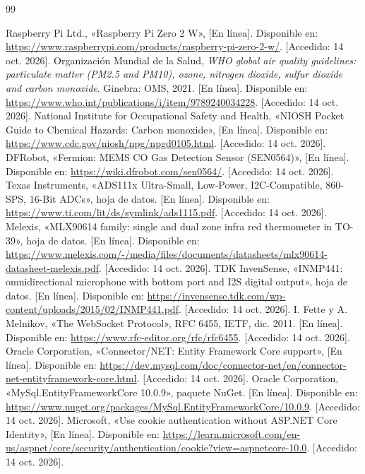 \documentclass[10pt,a4paper]{article}
\begin{document}
\clearpage
\begin{thebibliography}{99}
\small
{} Raspberry Pi Ltd., «Raspberry Pi Zero 2 W», [En línea]. Disponible en: \url{https://www.raspberrypi.com/products/raspberry-pi-zero-2-w/}. [Accedido: 14 oct. 2026].
 Organización Mundial de la Salud, \emph{WHO global air quality guidelines: particulate matter (PM2.5 and PM10), ozone, nitrogen dioxide, sulfur dioxide and carbon monoxide}. Ginebra: OMS, 2021. [En línea]. Disponible en: \url{https://www.who.int/publications/i/item/9789240034228}. [Accedido: 14 oct. 2026].
 National Institute for Occupational Safety and Health, «NIOSH Pocket Guide to Chemical Hazards: Carbon monoxide», [En línea]. Disponible en: \url{https://www.cdc.gov/niosh/npg/npgd0105.html}. [Accedido: 14 oct. 2026].
 DFRobot, «Fermion: MEMS CO Gas Detection Sensor (SEN0564)», [En línea]. Disponible en: \url{https://wiki.dfrobot.com/sen0564/}. [Accedido: 14 oct. 2026].
 Texas Instruments, «ADS111x Ultra-Small, Low-Power, I2C-Compatible, 860-SPS, 16-Bit ADCs», hoja de datos. [En línea]. Disponible en: \url{https://www.ti.com/lit/ds/symlink/ads1115.pdf}. [Accedido: 14 oct. 2026].
 Melexis, «MLX90614 family: single and dual zone infra red thermometer in TO-39», hoja de datos. [En línea]. Disponible en: \url{https://www.melexis.com/-/media/files/documents/datasheets/mlx90614-datasheet-melexis.pdf}. [Accedido: 14 oct. 2026].
 TDK InvenSense, «INMP441: omnidirectional microphone with bottom port and I2S digital output», hoja de datos. [En línea]. Disponible en: \url{https://invensense.tdk.com/wp-content/uploads/2015/02/INMP441.pdf}. [Accedido: 14 oct. 2026].
 I. Fette y A. Melnikov, «The WebSocket Protocol», RFC 6455, IETF, dic. 2011. [En línea]. Disponible en: \url{https://www.rfc-editor.org/rfc/rfc6455}. [Accedido: 14 oct. 2026].
 Oracle Corporation, «Connector/NET: Entity Framework Core support», [En línea]. Disponible en: \url{https://dev.mysql.com/doc/connector-net/en/connector-net-entityframework-core.html}. [Accedido: 14 oct. 2026].
 Oracle Corporation, «MySql.EntityFrameworkCore 10.0.9», paquete NuGet. [En línea]. Disponible en: \url{https://www.nuget.org/packages/MySql.EntityFrameworkCore/10.0.9}. [Accedido: 14 oct. 2026].
 Microsoft, «Use cookie authentication without ASP.NET Core Identity», [En línea]. Disponible en: \url{https://learn.microsoft.com/en-us/aspnet/core/security/authentication/cookie?view=aspnetcore-10.0}. [Accedido: 14 oct. 2026].

\end{thebibliography}
\end{document}
